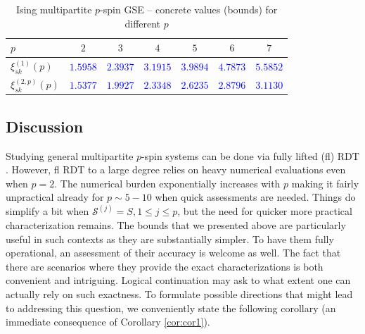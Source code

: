 \documentclass[10pt]{article}
\newcommand{\bl}[1]{\textcolor{blue}{#1}}
\def\cS{{\mathcal S}}
\begin{document}
\begin{table}[h]
\caption{Ising multipartite $p$-spin  GSE  -- concrete  values (bounds)  for different $p$ }\vspace{.1in}
\centering
\def\arraystretch{1.2}
\begin{tabular}{||l||c||c||c||c||c||c|| }\hline\hline
 \hspace{-0in}$p$                                             & $2$    & $3$ & $4$ &  $5$ & $6$ &  $7$   \\ \hline\hline
$\xi_{sk}^{(1)} (p )$                                         &  \bl{$\mathbf{1.5958}$} &  \bl{$\mathbf{  2.3937}$} &  \bl{$\mathbf{3.1915}$} & \bl{$\mathbf{3.9894}$}  &  \bl{$\mathbf{4.7873}$} &  \bl{$\mathbf{5.5852}$} \\ \hline\hline
$\xi_{sk}^{(2,p)} (p )$                                         & \bl{$\mathbf{1.5377}$}  & \bl{$\mathbf{1.9927}$}  & \bl{$\mathbf{ 2.3348}$} &
\bl{$\mathbf{ 2.6235}$}  & \bl{$\mathbf{2.8796}$} & \bl{$\mathbf{3.1130}$}  \\ \hline\hline
\end{tabular}
\label{tab:tab2}
\end{table}




\subsection{Discussion}
\label{sec:disc}

Studying general multipartite $p$-spin systems can be done via fully lifted (fl) RDT \cite{Stojnicflrdt23,Stojnicnflgscompyx23}.   However, fl RDT to a large degree relies on heavy numerical evaluations even when $p=2$. The numerical burden exponentially increases with $p$ making it fairly unpractical already for $p\sim 5-10$ when quick assessments are needed. Things do simplify a bit when $\cS^{(j)}=S,1\leq j\leq p$, but the need for quicker more practical characterization remains. The bounds that we presented above are particularly useful in such contexts as they are substantially simpler. To have them fully operational, an assessment of their accuracy is welcome as well. The fact that there are scenarios where they  provide the exact characterizations is both convenient and intriguing. Logical continuation may ask to what extent one can actually rely on such exactness. To formulate possible directions that might lead to addressing this question, we conveniently state the following corollary (an immediate consequence of Corollary \ref{cor:cor1}).
\end{document}
